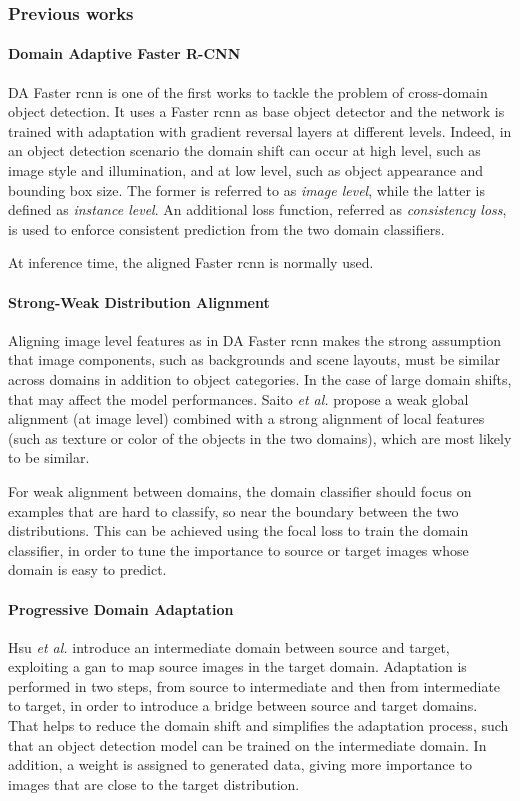 \documentclass[%
    corpo=12pt,
    twoside,
    stile=classica,   
    tipotesi=magistrale,
    evenboxes,
    english,
	numerazioneromana,
]{toptesi}
\begin{document}
\subsubsection{Previous works}
\paragraph{Domain Adaptive Faster R-CNN}\label{sec:dafrcnn}
DA Faster \acrshort{rcnn}\cite{chen2018domain} is one of the first works to tackle the problem of cross-domain object detection. It uses a Faster \acrshort{rcnn} as base object detector and the network is trained with adaptation with gradient reversal layers at different levels. Indeed, in an object detection scenario the domain shift can occur at high level, such as image style and illumination, and at low level, such as object appearance and bounding box size. The former is referred to as \textit{image level}, while the latter is defined as \textit{instance level}. An additional loss function, referred as \textit{consistency loss}, is used to enforce consistent prediction from the two domain classifiers.

At inference time, the aligned Faster \gls{rcnn} is normally used.

\paragraph{Strong-Weak Distribution Alignment}
Aligning image level features as in DA Faster \acrshort{rcnn} makes the strong assumption that image components, such as backgrounds and scene layouts, must be similar across domains in addition to object categories. In the case of large domain shifts, that may affect the model performances. Saito \emph{et al.}\cite{saito2019strongweak} propose a weak global alignment (at image level) combined with a strong alignment of local features (such as texture or color of the objects in the two domains), which are most likely to be similar.

For weak alignment between domains, the domain classifier should focus on examples that are hard to classify, so near the boundary between the two distributions. This can be achieved using the focal loss to train the domain classifier, in order to tune the importance to source or target images whose domain is easy to predict.

\paragraph{Progressive Domain Adaptation}
Hsu \emph{et al.}\cite{hsu2019progressive} introduce an intermediate domain between source and target, exploiting a \gls{gan} to map source images in the target domain. Adaptation is performed in two steps, from source to intermediate and then from intermediate to target, in order to introduce a bridge between source and target domains. That helps to reduce the domain shift and simplifies the adaptation process, such that an object detection model can be trained on the intermediate domain. In addition, a weight is assigned to generated data, giving more importance to images that are close to the target distribution.
\end{document}
